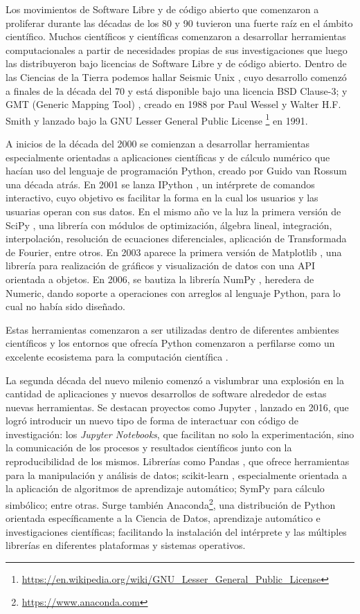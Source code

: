 Los movimientos de Software Libre y de código abierto que comenzaron
a proliferar durante las décadas de los 80 y 90 tuvieron una fuerte raíz en
el ámbito científico.
Muchos científicos y científicas comenzaron a desarrollar herramientas
computacionales a partir de necesidades propias de sus investigaciones que
luego las distribuyeron bajo licencias de Software Libre y de código abierto.
Dentro de las Ciencias de la Tierra podemos hallar Seismic Unix
\citep{seismicunix}, cuyo desarrollo comenzó a finales de la década del 70
y está disponible bajo una licencia BSD Clause-3; y GMT (Generic Mapping Tool)
\citep{gmt1991,gmt2019}, creado en 1988 por Paul Wessel y Walter H.F.
Smith y lanzado bajo la GNU Lesser General Public License%
\footnote{%
    \url{https://en.wikipedia.org/wiki/GNU_Lesser_General_Public_License}%
}
en 1991.

A inicios de la década del 2000 se comienzan a desarrollar herramientas
especialmente orientadas a aplicaciones científicas y de cálculo numérico que
hacían uso del lenguaje de programación Python, creado por Guido van Rossum una
década atrás.
En 2001 se lanza IPython \citep{perez2007}, un intérprete de comandos
interactivo, cuyo objetivo es facilitar la forma en la cual los usuarios y las
usuarias operan con sus datos.
En el mismo año ve la luz la primera versión de SciPy \citep{scipy2020}, una
librería con módulos de optimización, álgebra lineal, integración,
interpolación, resolución de ecuaciones diferenciales, aplicación de
Transformada de Fourier, entre otros.
En 2003 aparece la primera versión de Matplotlib \citep{matplotlib2007}, una
librería para realización de gráficos y visualización de datos con una \ac{API}
orientada a objetos.
En 2006, se bautiza la librería NumPy \citep{numpy2020}, heredera de Numeric,
dando soporte a operaciones con arreglos al lenguaje Python, para lo cual no
había sido diseñado.

Estas herramientas comenzaron a ser utilizadas dentro de diferentes ambientes
científicos y los entornos que ofrecía Python comenzaron a perfilarse como un
excelente ecosistema para la computación científica
\citep{travis2007,millman2011,perez2011}.

La segunda década del nuevo milenio comenzó a vislumbrar una explosión en la
cantidad de aplicaciones y nuevos desarrollos de software alrededor de estas
nuevas herramientas.
Se destacan proyectos como Jupyter \citep{jupyter2016}, lanzado en 2016, que
logró introducir un nuevo tipo de forma de interactuar con código de
investigación: los \emph{Jupyter Notebooks}, que facilitan no solo la
experimentación, sino la comunicación de los procesos y resultados científicos
junto con la reproducibilidad de los mismos.
Librerías como Pandas \citep{pandas2010}, que ofrece herramientas para la
manipulación y análisis de datos; scikit-learn \citep{sklearn2011},
especialmente orientada a la aplicación de algoritmos de aprendizaje
automático; SymPy \citep{sympy2017} para cálculo simbólico; entre otras.
Surge también Anaconda\footnote{\url{https://www.anaconda.com}}, una
distribución de Python orientada específicamente a la Ciencia de Datos,
aprendizaje automático e investigaciones científicas; facilitando la
instalación del intérprete y las múltiples librerías en diferentes plataformas
y sistemas operativos.

